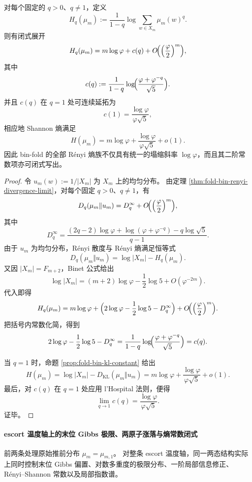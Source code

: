 \begin{theorem}\label{thm:xi-fold-renyi-constant-spectrum-closed-form}
对每个固定的 \(q>0\)、\(q\neq 1\)，定义
\[
H_q(\mu_m):=\frac{1}{1-q}\log\sum_{w\in X_m}\mu_m(w)^q.
\]
则有闭式展开
\[
H_q(\mu_m)
=
m\log\varphi+c(q)+O\!\Bigl(\Bigl(\frac{\varphi}{2}\Bigr)^m\Bigr),
\]
其中
\[
c(q):=\frac{1}{1-q}\log\!\Bigl(\frac{\varphi+\varphi^{-q}}{\sqrt5}\Bigr).
\]
并且 \(c(q)\) 在 \(q=1\) 处可连续延拓为
\[
c(1)=\frac{\log\varphi}{\varphi\sqrt5},
\]
相应地 Shannon 熵满足
\[
H(\mu_m)=m\log\varphi+\frac{\log\varphi}{\varphi\sqrt5}+o(1).
\]
因此 bin-fold 的全部 Rényi 熵族不仅具有统一的塌缩斜率 \(\log\varphi\)，而且其二阶常数项亦可闭式写出。
\end{theorem}
\begin{proof}
令 \(u_m(w):=1/|X_m|\) 为 \(X_m\) 上的均匀分布。
由定理 \ref{thm:fold-bin-renyi-divergence-limit}，对每个固定 \(q>0\)、\(q\neq 1\)，有
\[
D_q(\mu_m\Vert u_m)=D_q^\infty+O\!\Bigl(\Bigl(\frac{\varphi}{2}\Bigr)^m\Bigr),
\]
其中
\[
D_q^\infty
=
\frac{(2q-2)\log\varphi+\log(\varphi+\varphi^{-q})-q\log\sqrt5}{q-1}.
\]
由于 \(u_m\) 为均匀分布，Rényi 散度与 Rényi 熵满足恒等式
\[
D_q(\mu_m\Vert u_m)=\log|X_m|-H_q(\mu_m).
\]
又因 \(|X_m|=F_{m+2}\)，Binet 公式给出
\[
\log|X_m|=(m+2)\log\varphi-\frac12\log 5+O(\varphi^{-2m}).
\]
代入即得
\[
H_q(\mu_m)
=
m\log\varphi+
\Bigl(2\log\varphi-\frac12\log 5-D_q^\infty\Bigr)
+O\!\Bigl(\Bigl(\frac{\varphi}{2}\Bigr)^m\Bigr).
\]
把括号内常数化简，得到
\[
2\log\varphi-\frac12\log 5-D_q^\infty
=
\frac{1}{1-q}\log\!\Bigl(\frac{\varphi+\varphi^{-q}}{\sqrt5}\Bigr)
=c(q).
\]

当 \(q=1\) 时，命题 \ref{prop:fold-bin-kl-constant} 给出
\[
H(\mu_m)=\log|X_m|-D_{\mathrm{KL}}(\mu_m\Vert u_m)
=m\log\varphi+\frac{\log\varphi}{\varphi\sqrt5}+o(1).
\]
最后，对 \(c(q)\) 在 \(q=1\) 处应用 l'Hospital 法则，便得
\[
\lim_{q\to 1}c(q)=\frac{\log\varphi}{\varphi\sqrt5}.
\]
证毕。
\end{proof}

\paragraph{escort 温度轴上的末位 Gibbs 极限、两原子涨落与熵常数闭式}
前两条处理原始推前分布 \(\mu_m=\mu_{m,1}\)。
对整条 escort 温度轴，同一两态结构实际上同时控制末位 Gibbs 偏置、对数多重度的极限分布、一阶局部信息修正、Rényi--Shannon 常数以及局部指数谱。

